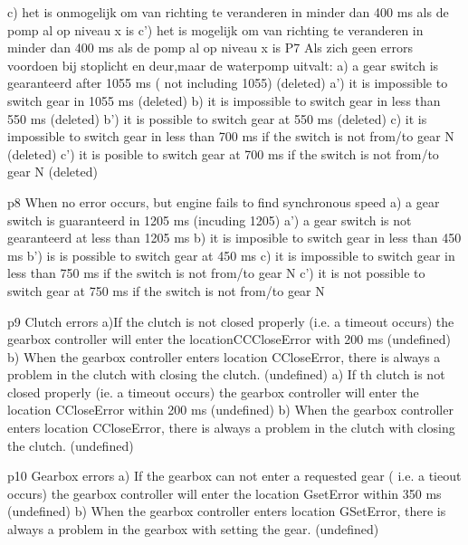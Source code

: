  c) het is onmogelijk om van richting te veranderen in minder dan 400 ms als de pomp al op niveau x is
 c') het is mogelijk om van richting te veranderen in minder dan 400 ms als de pomp al op niveau x is
 P7 Als zich geen errors voordoen bij stoplicht en deur,maar de waterpomp uitvalt:
 a)  a gear switch is gearanteerd after 1055 ms ( not including  1055)  (deleted)
 a') it is impossible  to switch gear in 1055 ms     (deleted)
 b) it is  impossible to switch gear in less than 550 ms (deleted)
 b') it is possible to switch gear at 550 ms (deleted)
 c) it is impossible to switch  gear in  less than 700 ms if the switch is not from/to gear N (deleted)
 c') it is posible to switch gear at 700 ms if the switch is not from/to gear N (deleted)
 
 
 p8 When no error occurs, but engine fails to find synchronous speed
 a) a gear switch is guaranteerd in 1205 ms (incuding 1205)
 a') a gear switch is not gearanteerd at less than 1205 ms
 b) it is imposible to switch gear in less than 450 ms
 b') is is possible to switch gear at 450 ms
 c) it is impossible to switch gear in less than 750 ms if the switch is not from/to gear N
 c') it is not possible to switch gear at 750 ms if the switch is not from/to gear N
 
 
 p9 Clutch errors
 a)If the clutch is not closed properly (i.e. a timeout occurs) the gearbox  controller will enter the locationCCCloseError with 200 ms   (undefined)
 b)  When the gearbox controller enters location CCloseError, there is always a problem in the clutch with closing the clutch.  (undefined)
 a) If th clutch is not closed properly (ie. a timeout occurs) the gearbox controller will enter the location CCloseError within 200 ms (undefined)
 b) When the gearbox controller enters location CCloseError, there is always a problem in the clutch with closing the clutch. (undefined)
 
 
 p10 Gearbox errors  
 a) If the gearbox can not enter a requested gear ( i.e. a tieout occurs) the gearbox controller will enter the location GsetError within 350 ms (undefined)
 b) When the gearbox controller enters location GSetError, there is always a problem in the gearbox with setting the gear. (undefined)
 
